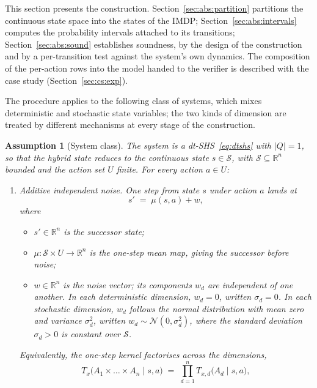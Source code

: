 \documentclass[11pt,a4paper]{article}
\newcommand{\R}{\mathbb{R}}
\newcommand{\Norm}{\mathcal{N}}
\theoremstyle{plain}
\newtheorem{assumption}{Assumption}
\theoremstyle{remark}
\begin{document}
	This section presents the construction. Section~\ref{sec:abs:partition} partitions the continuous state space into the states of the IMDP; Section~\ref{sec:abs:intervals} computes the probability intervals attached to its transitions; Section~\ref{sec:abs:sound} establishes soundness, by the design of the construction and by a per-transition test against the system's own dynamics. The composition of the per-action rows into the model handed to the verifier is described with the case study (Section~\ref{sec:cs:exp}).
	
	The procedure applies to the following class of systems, which mixes
	deterministic and stochastic state variables; the two kinds of dimension
	are treated by different mechanisms at every stage of the construction.
	
	\begin{assumption}[System class]\label{ass:sysclass}
		The system is a dt-SHS~\eqref{eq:dtshs} with $|Q| = 1$, so that the
		hybrid state reduces to the continuous state $s \in \mathcal{S}$, with
		$\mathcal{S} \subseteq \R^n$ bounded and the action set $U$ finite. For
		every action $a \in U$:
		\begin{enumerate}[label=(\roman*)]
			\item \emph{Additive independent noise.} One step from state $s$ under
			action $a$ lands at
			\begin{equation}
				s' \;=\; \mu(s, a) + w,
				\label{eq:addnoise}
			\end{equation}
			where
			\begin{itemize}
				\item $s' \in \R^n$ is the successor state;
				\item $\mu : \mathcal{S} \times U \to \R^n$ is the one-step mean map,
				giving the successor before noise;
				\item $w \in \R^n$ is the noise vector; its components $w_d$ are
				independent of one another. In each \emph{deterministic} dimension,
				$w_d = 0$, written $\sigma_d = 0$. In each \emph{stochastic} dimension,
				$w_d$ follows the normal distribution with mean zero and variance
				$\sigma_d^2$, written $w_d \sim \Norm(0, \sigma_d^2)$, where the
				standard deviation $\sigma_d > 0$ is constant over $\mathcal{S}$.
			\end{itemize}
			Equivalently, the one-step kernel factorises across the dimensions,
			\begin{equation}
				T_x\bigl(A_1 \times \dots \times A_n \mid s, a\bigr)
				\;=\; \prod_{d=1}^{n} T_{x,d}\bigl(A_d \mid s, a\bigr),

\end{equation}
\end{enumerate}
\end{assumption}
\end{document}
